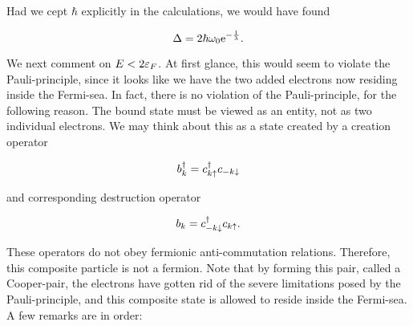 Had we cept $\hbar$ explicitly in the calculations, we would have found 

\begin{equation}
\label{eq:cooper_delta}
\Delta = 2\hbar \omega_0 \mathrm{e}^{-\frac{1}{\lambda}}. 
\end{equation}

We next comment on $E < 2\varepsilon_F$. At first glance, this would seem to violate the Pauli-principle, since it looks like we have the two added electrons now residing inside the Fermi-sea. In fact, there is no violation of the Pauli-principle, for the following reason. The bound state must be viewed as an entity, not as two individual electrons. We may think about this as a state created by a creation operator 

\begin{equation}
b^{\dagger}_k = c^{\dagger}_{k \uparrow} c_{-k \downarrow}
\end{equation}

and corresponding destruction operator 

\begin{equation}
b_k = c^{\dagger}_{-k \downarrow} c_{k \uparrow}.
\end{equation}

These operators do not obey fermionic anti-commutation relations. Therefore, this composite particle is not a fermion. Note that by forming this pair, called a Cooper-pair, the electrons have gotten rid of the severe limitations posed by the Pauli-principle, and this composite state is allowed to reside inside the Fermi-sea. A few remarks are in order: 

